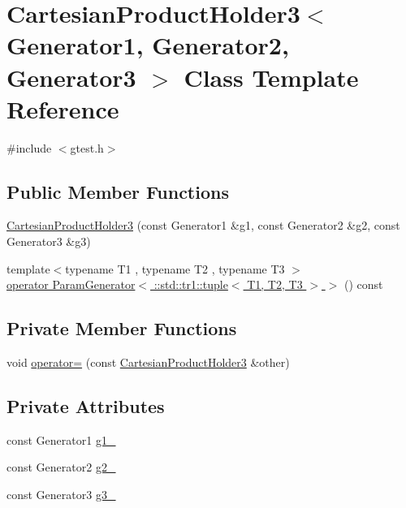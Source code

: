 \hypertarget{classtesting_1_1internal_1_1CartesianProductHolder3}{\section{\-Cartesian\-Product\-Holder3$<$ \-Generator1, \-Generator2, \-Generator3 $>$ \-Class \-Template \-Reference}
\label{d4/d98/classtesting_1_1internal_1_1CartesianProductHolder3}
}


{\ttfamily \#include $<$gtest.\-h$>$}

\subsection*{\-Public \-Member \-Functions}
\begin{DoxyCompactItemize}
\item 
\hyperlink{classtesting_1_1internal_1_1CartesianProductHolder3_a67cb26236d02850927c8f45a70b19fb9}{\-Cartesian\-Product\-Holder3} (const \-Generator1 \&g1, const \-Generator2 \&g2, const \-Generator3 \&g3)
\item 
{\footnotesize template$<$typename T1 , typename T2 , typename T3 $>$ }\\\hyperlink{classtesting_1_1internal_1_1CartesianProductHolder3_acfb565252b9f957d05f110b2af93d0cc}{operator Param\-Generator$<$ \-::std\-::tr1\-::tuple$<$ T1, T2, T3 $>$ $>$} () const 
\end{DoxyCompactItemize}
\subsection*{\-Private \-Member \-Functions}
\begin{DoxyCompactItemize}
\item 
void \hyperlink{classtesting_1_1internal_1_1CartesianProductHolder3_adf5cdd2a58d00a5a0afeb7b65e02d985}{operator=} (const \hyperlink{classtesting_1_1internal_1_1CartesianProductHolder3}{\-Cartesian\-Product\-Holder3} \&other)
\end{DoxyCompactItemize}
\subsection*{\-Private \-Attributes}
\begin{DoxyCompactItemize}
\item 
const \-Generator1 \hyperlink{classtesting_1_1internal_1_1CartesianProductHolder3_a36a04c8f9e515291d6a093ab378084f7}{g1\-\_\-}
\item 
const \-Generator2 \hyperlink{classtesting_1_1internal_1_1CartesianProductHolder3_a6cfd9fa9a396d07747d5ebb1f05c7f22}{g2\-\_\-}
\item 
const \-Generator3 \hyperlink{classtesting_1_1internal_1_1CartesianProductHolder3_a79088ad1a5d8e0e316bd20057b9cfb3f}{g3\-\_\-}
\end{DoxyCompactItemize}


